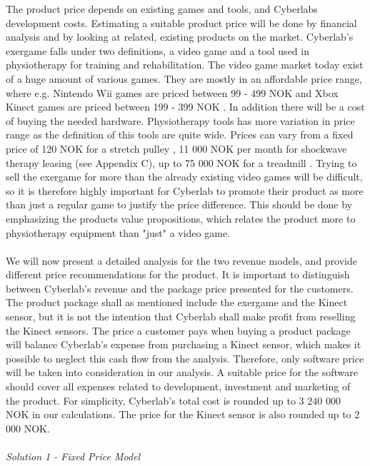 The product price depends on existing games and tools, and Cyberlabs development costs. Estimating a suitable product price will be done by financial analysis and by looking at related, existing products on the market. Cyberlab's exergame falls under two definitions, a video game and a tool used in physiotherapy for training and rehabilitation. The video game market today exist of a huge amount of various games. They are mostly in an affordable price range, where e.g. Nintendo Wii games are priced between 99 - 499 NOK \cite{elkjopwii} and Xbox Kinect games are priced between 199 - 399 NOK \cite{elkjopkinect}. In addition there will be a cost of buying the needed hardware. Physiotherapy tools has more variation in price range as the definition of this tools are quite wide. Prices can vary from a fixed price of 120 NOK for a stretch pulley \cite{stretchpulley}, 11 000 NOK per month for shockwave therapy leasing (see Appendix C), up to 75 000 NOK for a treadmill \cite{treadmill}. Trying to sell the exergame for more than the already existing video games will be difficult, so it is therefore highly important for Cyberlab to promote their product as more than just a regular game to justify the price difference. This should be done by emphasizing the products value propositions, which relates the product more to physiotherapy equipment than "just" a video game. \\ \\
We will now present a detailed analysis for the two revenue models, and provide different price recommendations for the product. It is important to distinguish between Cyberlab's revenue and the package price presented for the customers. The product package shall as mentioned include the exergame and the Kinect sensor, but it is not the intention that Cyberlab shall make profit from reselling the Kinect sensors. The price a customer pays when buying a product package will balance Cyberlab's expense from purchasing a Kinect sensor, which makes it possible to neglect this cash flow from the analysis. Therefore, only software price will be taken into consideration in our analysis. A suitable price for the software should cover all expenses related to development, investment and marketing of the product. For simplicity, Cyberlab's total cost is rounded up to 3 240 000 NOK in our calculations. The price for the Kinect sensor is also rounded up to 2 000 NOK. \\ \\ 
\emph{Solution 1 - Fixed Price Model}\\ \\
